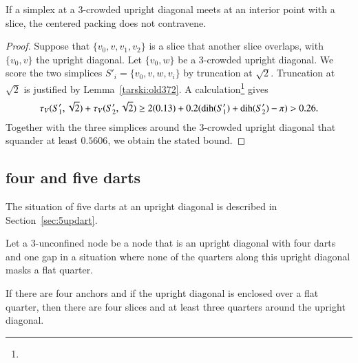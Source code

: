 \begin{lemma}
If a simplex at a $3$-crowded upright diagonal meets at an
interior point with a slice, the centered packing does
not contravene.
\end{lemma}

\begin{proof}
Suppose that $\{v_0,v,v_1,v_2\}$ is a slice that another
slice overlaps, with $\{v_0,v\}$ the upright diagonal.  Let
$\{v_0,w\}$ be a $3$-crowded upright diagonal. We score the two
simplices $S'_i = \{v_0,v,w,v_i\}$ by truncation at $\sqrt{2}$.
Truncation at $\sqrt{2}$ is justified by Lemma~\ref{tarski:old372}.
A calculation\footnote{} %
gives
    $$\tau_V(S'_1,\sqrt{2})+\tau_V(S'_2,\sqrt{2})\ge 2(0.13) +
        0.2(\operatorname{dih}(S'_1)+\operatorname{dih}(S'_2)-\pi) > 0.26.
    $$
Together with the three simplices around the $3$-crowded upright
diagonal that squander at least $0.5606$, we obtain the stated
bound.
\end{proof}



\subsection{four and five darts} %
    \label{sec:five-anchors}



\begin{remark}\label{rem:5dart}
The situation of five darts at an upright diagonal is
described in Section~\ref{sec:5updart}.
\end{remark}

\begin{definition}
Let a $3$-unconfined node be a node that is an upright diagonal 
with four darts and one gap in a situation where none of
the quarters along this upright diagonal masks a flat quarter.
\end{definition}

\begin{lemma}
If there are four anchors and if the upright diagonal is enclosed over a
flat quarter, then there are four slices and at least three
quarters around the upright diagonal.
\end{lemma}

